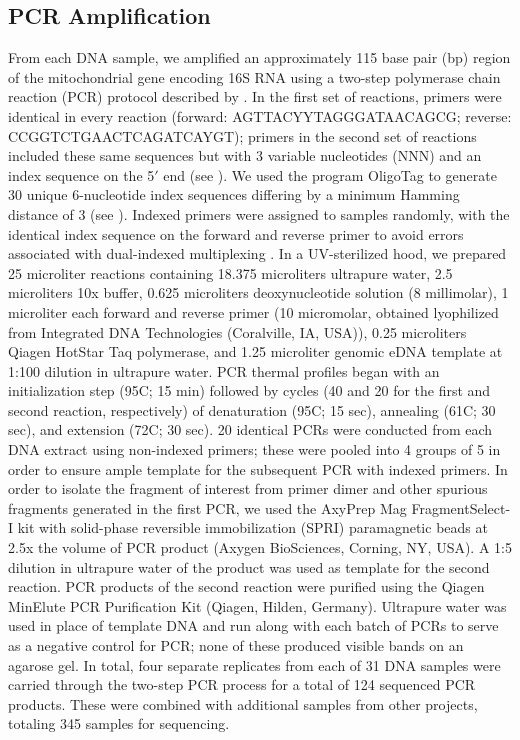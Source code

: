 \documentclass[11pt,letterpaper]{article} %
\begin{document}
\subsection*{PCR Amplification}
From each DNA sample, we amplified an approximately 115 base pair (bp) region of the mitochondrial gene encoding 16S RNA using a two-step polymerase chain reaction (PCR) protocol described by \citet{ODonnell2016}. In the first set of reactions, primers were identical in every reaction (forward: AGTTACYYTAGGGATAACAGCG; reverse: CCGGTCTGAACTCAGATCAYGT); primers in the second set of reactions included these same sequences but with 3 variable nucleotides (NNN) and an index sequence on the 5$'$ end (see ). We used the program OligoTag \citep{Coissac2012} to generate 30 unique 6-nucleotide index sequences differing by a minimum Hamming distance of 3 (see ). Indexed primers were assigned to samples randomly, with the identical index sequence on the forward and reverse primer to avoid errors associated with dual-indexed multiplexing \citep{Schnell2015}. In a UV-sterilized hood, we prepared 25 microliter reactions containing 18.375 microliters ultrapure water, 2.5 microliters 10x buffer, 0.625 microliters deoxynucleotide solution (8 millimolar), 1 microliter each forward and reverse primer (10 micromolar, obtained lyophilized from Integrated DNA Technologies (Coralville, IA, USA)), 0.25 microliters Qiagen HotStar Taq polymerase, and 1.25 microliter genomic eDNA template at 1:100 dilution in ultrapure water. PCR thermal profiles began with an initialization step (95C; 15 min) followed by cycles (40 and 20 for the first and second reaction, respectively) of denaturation (95C; 15 sec), annealing (61C; 30 sec), and extension (72C; 30 sec). 20 identical PCRs were conducted from each DNA extract using non-indexed primers; these were pooled into 4 groups of 5 in order to ensure ample template for the subsequent PCR with indexed primers. In order to isolate the fragment of interest from primer dimer and other spurious fragments generated in the first PCR, we used the AxyPrep Mag FragmentSelect-I kit with solid-phase reversible immobilization (SPRI) paramagnetic beads at 2.5x the volume of PCR product (Axygen BioSciences, Corning, NY, USA). A 1:5 dilution in ultrapure water of the product was used as template for the second reaction. PCR products of the second reaction were purified using the Qiagen MinElute PCR Purification Kit (Qiagen, Hilden, Germany). Ultrapure water was used in place of template DNA and run along with each batch of PCRs to serve as a negative control for PCR; none of these produced visible bands on an agarose gel. In total, four separate replicates from each of 31 DNA samples were carried through the two-step PCR process for a total of 124 sequenced PCR products. These were combined with additional samples from other projects, totaling 345 samples for sequencing.
\end{document}
